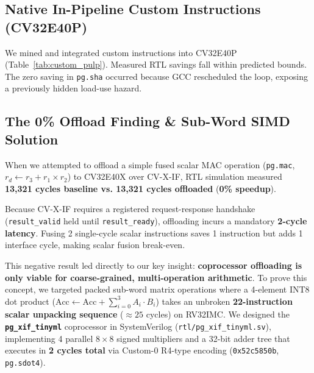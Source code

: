 \documentclass[conference]{IEEEtran}
\begin{document}
\subsection{Native In-Pipeline Custom Instructions (CV32E40P)}
We mined and integrated custom instructions into CV32E40P (Table~\ref{tab:custom_pulp}). Measured RTL savings fall within predicted bounds. The zero saving in \texttt{pg.sha} occurred because GCC rescheduled the loop, exposing a previously hidden load-use hazard.

\begin{table}[t]
\centering
\caption{Discovered Native Custom Instructions on CV32E40P}
\label{tab:custom_pulp}
\vspace{-4pt}
\end{table}

\subsection{The 0\% Offload Finding \& Sub-Word SIMD Solution}
When we attempted to offload a simple fused scalar MAC operation (\texttt{pg.mac}, $r_d \leftarrow r_3 + r_1 \times r_2$) to CV32E40X over CV-X-IF, RTL simulation measured \textbf{13,321 cycles baseline vs. 13,321 cycles offloaded} (\textbf{0\% speedup}). 

Because CV-X-IF requires a registered request-response handshake (\texttt{result\_valid} held until \texttt{result\_ready}), offloading incurs a mandatory \textbf{2-cycle latency}. Fusing 2 single-cycle scalar instructions saves 1 instruction but adds 1 interface cycle, making scalar fusion break-even. 

This negative result led directly to our key insight: \textbf{coprocessor offloading is only viable for coarse-grained, multi-operation arithmetic}. To prove this concept, we targeted packed sub-word matrix operations where a 4-element INT8 dot product ($\text{Acc} \leftarrow \text{Acc} + \sum_{i=0}^3 A_i \cdot B_i$) takes an unbroken \textbf{22-instruction scalar unpacking sequence} ($\approx 25$ cycles) on RV32IMC. We designed the \textbf{\texttt{pg\_xif\_tinyml}} coprocessor in SystemVerilog (\texttt{rtl/pg\_xif\_tinyml.sv}), implementing 4 parallel $8\times 8$ signed multipliers and a 32-bit adder tree that executes in \textbf{2 cycles total} via Custom-0 R4-type encoding (\texttt{0x52c5850b}, \texttt{pg.sdot4}).
\end{document}
